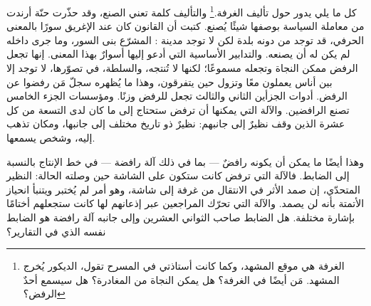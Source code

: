 كل ما يلي يدور حول تأليف الغرفة.\footnote{الغرفة هي موقع المشهد، وكما كانت أستاذتي في المسرح تقول، الديكور يُخرج المشهد. مَن أيضًا في الغرفة؟ هل يمكن النجاة من المغادرة؟ هل سيسمع أحدٌ الرفض؟} والتأليف كلمة تعني الصنع، وقد حذّرت حنّة أرندت من معاملة السياسة بوصفها شيئًا يُصنع. كتبت أن القانون كان عند الإغريق سورًا بالمعنى الحرفي، قد توجد من دونه بلدة لكن لا توجد مدينة \autocite{arendt1958human}: المشرّع بنى السور، وما جرى داخله لم يكن له أن يصنعه. والتدابير الأساسية التي أدعو إليها أسوارٌ بهذا المعنى. إنها تجعل الرفض ممكن النجاة وتجعله مسموعًا؛ لكنها لا تُنتجه، والسلطة، في تصوّرها، لا توجد إلا بين أناس يعملون معًا وتزول حين يتفرقون، وهذا ما يُظهره سجلّ مَن رفضوا عن الرفض. أدوات الجزأين الثاني والثالث تجعل للرفض وزنًا. ومؤسسات الجزء الخامس تصنع الرافضين. والآلة التي يمكنها أن ترفض ستحتاج إلى ما كان لدى التسعة من كل عشرة الذين وقف نظيرٌ إلى جانبهم: نظيرٌ ذو تاريخ مختلف إلى جانبها، ومكان تذهب إليه، وشخص يسمعها.

وهذا أيضًا ما يمكن أن يكونه رافضٌ — بما في ذلك آلة رافضة — في خط الإنتاج بالنسبة إلى الضابط. فالآلة التي ترفض كانت ستكون على الشاشة حين وصلته الحالة: النظير المتحدّي، إن صمد الأثر في الانتقال من غرفة إلى شاشة، وهو أمر لم يُختبر ويتنبأ انحياز الأتمتة بأنه لن يصمد. والآلة التي تحرّك المراجعين عبر إذعانهم لها كانت ستجعلهم أختامًا بإشارة مختلفة. هل الضابط صاحب الثواني العشرين وإلى جانبه آلة رافضة هو الضابط نفسه الذي في التقارير؟
